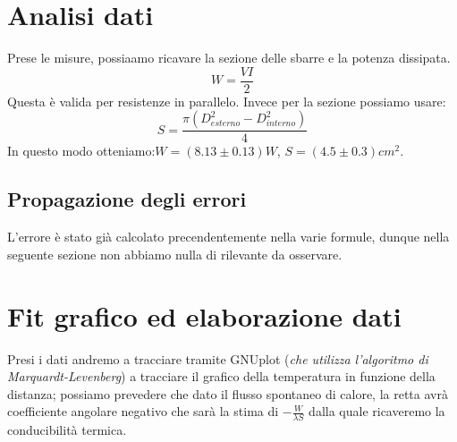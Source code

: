 \documentclass[a4paper,10pt]{article}
\begin{document}
\section{Analisi dati}
Prese le misure, possiaamo ricavare la sezione delle sbarre e la potenza dissipata.
\begin{equation}
 W=\frac{VI}{2}
\end{equation}
Questa è valida per resistenze in parallelo.
Invece per la sezione possiamo usare:
\begin{equation}
 S=\frac{\pi(D_{esterno}^2-D_{interno}^2)}{4}
\end{equation}
In questo modo otteniamo:$W=(8.13\pm0.13)W$, $S=(4.5\pm0.3)cm^2$.
\subsection{Propagazione degli errori}
L'errore è stato già calcolato precendentemente nella varie formule, dunque nella seguente sezione non abbiamo nulla di rilevante da osservare.
\section{Fit grafico ed elaborazione dati}
Presi i dati andremo a tracciare tramite GNUplot (\textit{che utilizza l'algoritmo di Marquardt-Levenberg}) a tracciare il grafico della temperatura in funzione della distanza;
possiamo prevedere che dato il flusso spontaneo di calore, la retta avrà coefficiente angolare negativo che sarà la stima di $-\frac{W}{\lambda S}$ dalla quale ricaveremo la conducibilità termica.
\end{document}
